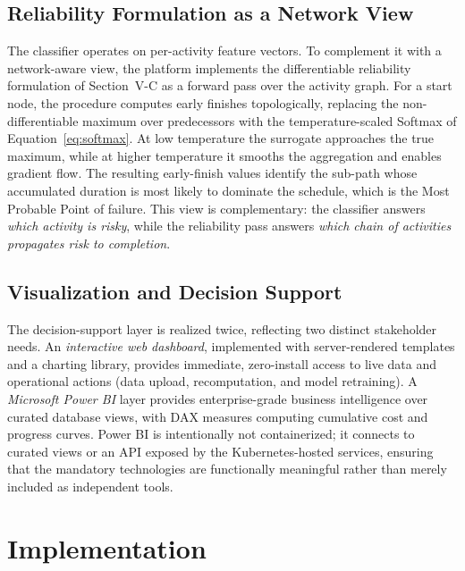 \documentclass[conference]{IEEEtran}
\begin{document}
\subsection{Reliability Formulation as a Network View}

The classifier operates on per-activity feature vectors. To complement it with a network-aware view, the platform implements the differentiable reliability formulation of Section~V-C as a forward pass over the activity graph. For a start node, the procedure computes early finishes topologically, replacing the non-differentiable maximum over predecessors with the temperature-scaled Softmax of Equation~\eqref{eq:softmax}. At low temperature the surrogate approaches the true maximum, while at higher temperature it smooths the aggregation and enables gradient flow. The resulting early-finish values identify the sub-path whose accumulated duration is most likely to dominate the schedule, which is the Most Probable Point of failure. This view is complementary: the classifier answers \emph{which activity is risky}, while the reliability pass answers \emph{which chain of activities propagates risk to completion}.

\subsection{Visualization and Decision Support}

The decision-support layer is realized twice, reflecting two distinct stakeholder needs. An \emph{interactive web dashboard}, implemented with server-rendered templates and a charting library, provides immediate, zero-install access to live data and operational actions (data upload, recomputation, and model retraining). A \emph{Microsoft Power BI} layer provides enterprise-grade business intelligence over curated database views, with DAX measures computing cumulative cost and progress curves. Power BI is intentionally not containerized; it connects to curated views or an API exposed by the Kubernetes-hosted services, ensuring that the mandatory technologies are functionally meaningful rather than merely included as independent tools.

\section{Implementation}
\end{document}

